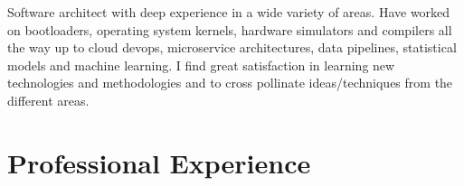 \documentclass[11pt,a4paper,sans]{moderncv}        %
\begin{document}
\makecvtitle

Software architect with deep experience in a wide variety of areas. Have worked
on bootloaders, operating system kernels, hardware simulators and compilers all
the way up to cloud devops, microservice architectures, data pipelines,
statistical models and machine learning. I find great satisfaction in learning
new technologies and methodologies and to cross pollinate ideas/techniques from
the different areas. 

\section{Professional Experience}
\end{document}
